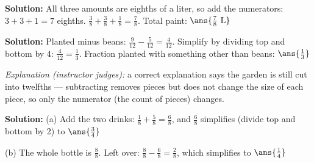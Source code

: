 \documentclass[12pt]{article}
\begin{document}

\textbf{Solution:} All three amounts are eighths of a liter, so add the
numerators: $3 + 3 + 1 = 7$ eighths.
$\tfrac{3}{8} + \tfrac{3}{8} + \tfrac{1}{8} = \tfrac{7}{8}$. Total paint:
$\ans{\tfrac{7}{8}\ \text{L}}$


\textbf{Solution:} Planted minus beans:
$\tfrac{9}{12} - \tfrac{5}{12} = \tfrac{4}{12}$. Simplify by dividing top and
bottom by 4: $\tfrac{4}{12} = \tfrac{1}{3}$. Fraction planted with something
other than beans: $\ans{\tfrac{1}{3}}$

\emph{Explanation (instructor judges):} a correct explanation says the garden
is still cut into twelfths --- subtracting removes pieces but does not change
the size of each piece, so only the numerator (the count of pieces) changes.


\textbf{Solution:} (a) Add the two drinks:
$\tfrac{1}{8} + \tfrac{5}{8} = \tfrac{6}{8}$, and $\tfrac{6}{8}$ simplifies
(divide top and bottom by 2) to $\ans{\tfrac{3}{4}}$

(b) The whole bottle is $\tfrac{8}{8}$. Left over:
$\tfrac{8}{8} - \tfrac{6}{8} = \tfrac{2}{8}$, which simplifies to
$\ans{\tfrac{1}{4}}$
\end{document}
